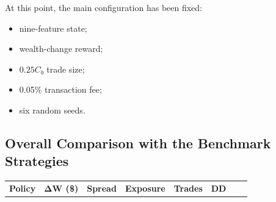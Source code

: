 At this point, the main configuration has been fixed:

\begin{itemize}
\item
  nine-feature state;
\item
  wealth-change reward;
\item
  \(0.25C₀\) trade size;
\item
  0.05\% transaction fee;
\item
  six random seeds.
\end{itemize}

\subsection{Overall Comparison with the Benchmark Strategies}

{\def\LTcaptype{none} %
\begin{longtable}[]{@{}
  >{\raggedright\arraybackslash}p{}
  >{\centering\arraybackslash}p{}
  >{\centering\arraybackslash}p{}
  >{\centering\arraybackslash}p{}
  >{\centering\arraybackslash}p{}
  >{\centering\arraybackslash}p{}
  >{\centering\arraybackslash}p{}
  >{\centering\arraybackslash}p{}@{}}
\toprule\noalign{}
\begin{minipage}[b]{\linewidth}\centering
\textbf{Policy}
\end{minipage} & \begin{minipage}[b]{\linewidth}\centering
\textbf{ΔW (\$)}
\end{minipage} & \begin{minipage}[b]{\linewidth}\centering
\textbf{Spread}
\end{minipage} & \begin{minipage}[b]{\linewidth}\centering
\textbf{Exposure}
\end{minipage} & \begin{minipage}[b]{\linewidth}\centering
\textbf{Trades}
\end{minipage} & \begin{minipage}[b]{\linewidth}\centering
\textbf{DD}
\end{minipage} & \begin{minipage}[b]{\linewidth}\centering

\end{minipage}
\end{longtable}}

